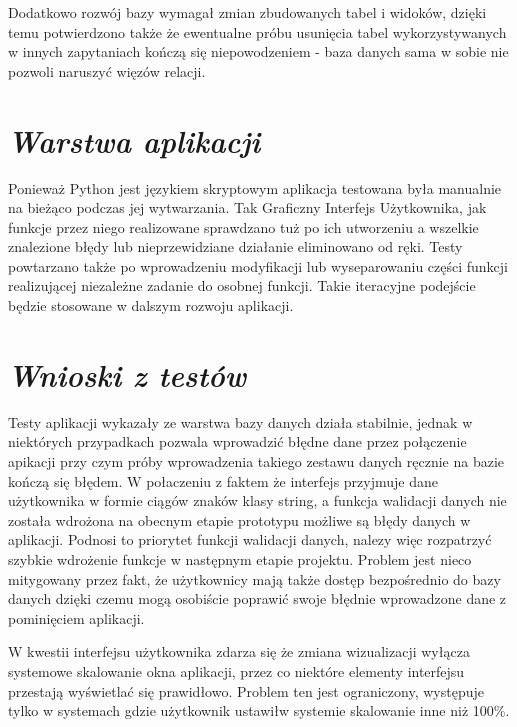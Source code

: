 \documentclass[a4paper,10pt, twoside]{report}
\newcommand{\customstylesection}[1]{\textbf{\textit{#1}}}
\begin{document}
{Dodatkowo rozwój bazy wymagał zmian zbudowanych tabel i widoków, dzięki temu 
potwierdzono także że ewentualne próbu usunięcia tabel wykorzystywanych w 
innych zapytaniach kończą się niepowodzeniem - baza danych sama w sobie nie 
pozwoli naruszyć więzów relacji.}

\section{\customstylesection{Warstwa aplikacji}}
{Ponieważ Python jest językiem skryptowym aplikacja testowana była manualnie 
na bieżąco podczas jej wytwarzania. Tak Graficzny Interfejs Użytkownika, jak 
funkcje przez niego realizowane sprawdzano tuż po ich utworzeniu a wszelkie 
znalezione błędy lub nieprzewidziane działanie eliminowano od ręki. Testy 
powtarzano także po wprowadzeniu modyfikacji lub wyseparowaniu części funkcji 
realizującej niezależne zadanie do osobnej funkcji. Takie iteracyjne podejście 
będzie stosowane w dalszym rozwoju aplikacji.}

\section{\customstylesection{Wnioski z testów}}
{Testy aplikacji wykazały ze warstwa bazy danych działa stabilnie, jednak w 
niektórych przypadkach pozwala wprowadzić błędne dane przez połączenie apikacji 
przy czym próby wprowadzenia takiego zestawu danych ręcznie na bazie kończą się 
błędem. W połaczeniu z faktem że interfejs przyjmuje dane użytkownika w formie 
ciągów znaków klasy string, a funkcja walidacji danych nie została wdrożona na 
obecnym etapie prototypu możliwe są błędy danych w aplikacji. Podnosi to 
priorytet funkcji walidacji danych, nalezy więc rozpatrzyć szybkie wdrożenie 
funkcje w następnym etapie projektu. Problem jest nieco mitygowany %
przez fakt, że użytkownicy mają także dostęp bezpośrednio do bazy danych dzięki 
czemu mogą osobiście poprawić swoje błędnie wprowadzone dane z pominięciem 
aplikacji.}

{W kwestii interfejsu użytkownika zdarza się że zmiana wizualizacji wyłącza 
systemowe skalowanie okna aplikacji, przez co niektóre elementy interfejsu 
przestają wyświetlać się prawidłowo. Problem ten jest ograniczony, występuje 
tylko w systemach gdzie użytkownik ustawiłw systemie skalowanie inne niż 100\%.}
\end{document}
